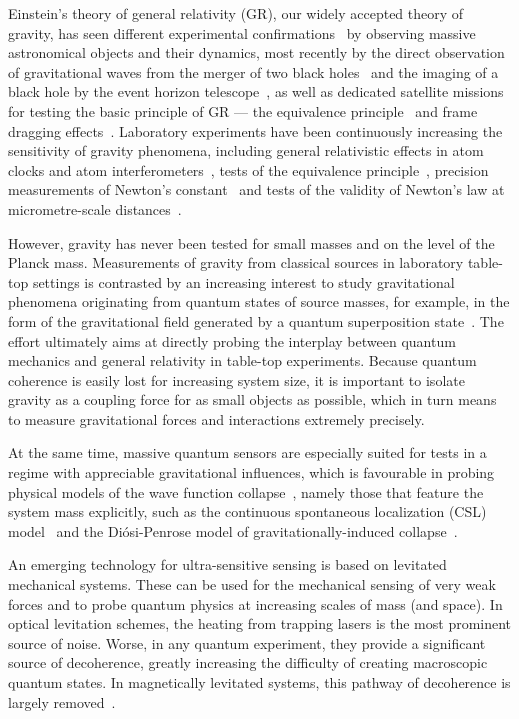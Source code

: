 Einstein’s theory of general relativity (GR), our widely accepted theory of gravity, has seen different experimental confirmations~\cite{Einstein1916,walsh1979} by observing massive astronomical objects and their dynamics, most recently by the direct observation of gravitational waves from the merger of two black holes~\cite{abbott2016} and the imaging of a black hole by the event horizon telescope~\cite{akiyama2019}, as well as dedicated satellite missions for testing the basic principle of GR --- the equivalence principle~\cite{touboul2017} and frame dragging effects~\cite{everitt2011}. Laboratory experiments have been continuously increasing the sensitivity of gravity phenomena, including general relativistic effects in atom clocks and atom interferometers~\cite{bothwell2022, asenbaum2017}, tests of the equivalence principle~\cite{rosi2017, asenbaum2020}, precision measurements of Newton's constant~\cite{rosi2014, quinn2013} and tests of the validity of Newton's law at micrometre-scale distances~\cite{geraci2008, tan2020}. 

However, gravity has never been tested for small masses and on the level of the Planck mass. Measurements of gravity from classical sources in laboratory table-top settings is contrasted by an increasing interest to study gravitational phenomena originating from quantum states of source masses, for example, in the form of the gravitational field generated by a quantum superposition state~\cite{bronstein2012republication, rickles2011role, bose2017, marletto2017, al2018optomechanical}. The effort ultimately aims at directly probing the interplay between quantum mechanics and general relativity in table-top experiments. Because quantum coherence is easily lost for increasing system size, it is important to isolate gravity as a coupling force for as small objects as possible, which in turn means to measure gravitational forces and interactions extremely precisely. 

At the same time, massive quantum sensors are especially suited for tests in a regime with appreciable gravitational influences, which is favourable in probing physical models of the wave function collapse~\cite{diosi2015, vinante2016,bassi2013}, namely those that feature the system mass explicitly, such as the continuous spontaneous localization (CSL) model~\cite{ghirardi1990} and the Di\'{o}si-Penrose model of gravitationally-induced collapse~\cite{diosi1987,penrose1996,oosterkamp2013}.


An emerging technology for ultra-sensitive sensing is based on levitated mechanical systems. These can be used for the mechanical sensing of very weak forces and to probe quantum physics at increasing scales of mass (and space). In optical levitation schemes, the heating from trapping lasers is the most prominent source of noise. Worse, in any quantum experiment, they provide a significant source of decoherence, greatly increasing the difficulty of creating macroscopic quantum states. In magnetically levitated systems, this pathway of decoherence is largely removed~\cite{Romero2021}.


